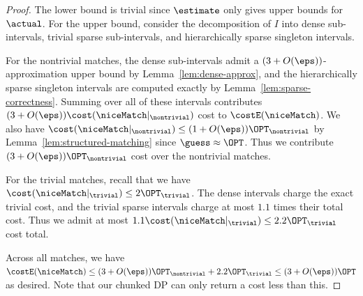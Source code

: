 \begin{proof}
    The lower bound is trivial since $\estimate$ only gives upper bounds for $\actual$. For the upper bound, consider the decomposition of $I$ into dense sub-intervals, trivial sparse sub-intervals, and hierarchically sparse singleton intervals. 
    
    For the nontrivial matches, the dense sub-intervals admit a $(3+O(\eps))$-approximation upper bound by Lemma~\ref{lem:dense-approx}, and the hierarchically sparse singleton intervals are computed exactly by Lemma~\ref{lem:sparse-correctness}. Summing over all of these intervals contributes $(3+O(\eps))\cost(\niceMatch|_{\nontrivial})$ cost to $\costE(\niceMatch)$. We also have $\cost(\niceMatch|_{\nontrivial}) \leq (1+O(\eps))\OPT_{\nontrivial}$ by Lemma~\ref{lem:structured-matching} since $\guess \approx \OPT$. Thus we contribute $(3+O(\eps))\OPT_{\nontrivial}$ cost over the nontrivial matches.

     For the trivial matches, recall that we have $\cost(\niceMatch|_{\trivial}) \leq 2\OPT_{\trivial}$. The dense intervals charge the exact trivial cost, and the trivial sparse intervals charge at most $1.1$ times their total cost. Thus we admit at most $1.1\cost(\niceMatch|_{\trivial}) \leq 2.2\OPT_{\trivial}$ cost total.

    Across all matches, we have $\costE(\niceMatch) \leq (3+O(\eps))\OPT_{\nontrivial} + 2.2\OPT_{\trivial} \leq (3+O(\eps))\OPT$ as desired. Note that our chunked DP can only return a cost less than this.
\end{proof}
